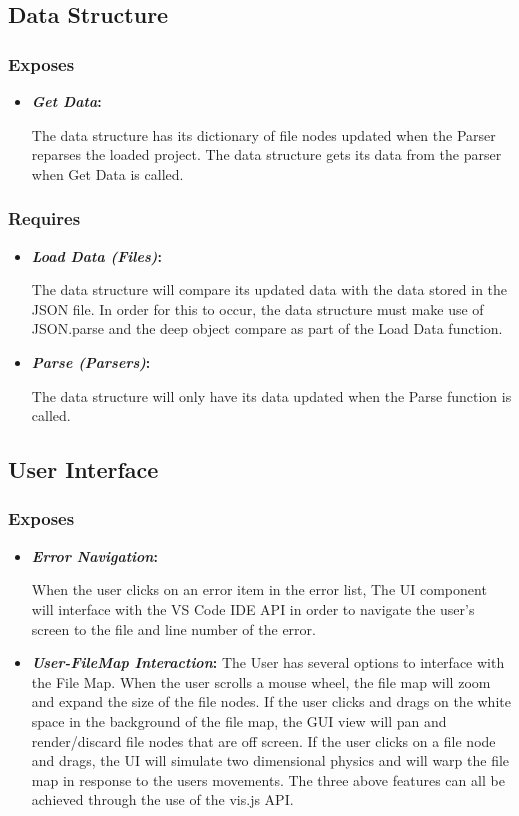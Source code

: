 \documentclass[letterpaper,10pt,titlepage,draftclsnofoot,onecolumn,onesided] {IEEEtran}
\newcommand{\boldit}[2]{
	\textbf{\textit{#1}#2}
}
\begin{document}
\subsection{Data Structure}
		
\subsubsection{Exposes}
\begin{itemize}
	\item \boldit{Get Data}{:} 
The data structure has its dictionary of file nodes updated when the Parser reparses the loaded project. 
The data structure gets its data from the parser when Get Data is called.
\end{itemize}
		
\subsubsection{Requires}
\begin{itemize}
	\item \boldit{Load Data (Files)}{:} 
The data structure will compare its updated data with the data stored in the JSON file. 
In order for this to occur, the data structure must make use of JSON.parse and the deep object compare as part of the Load Data function. \cite{stringify}
	\item \boldit{Parse (Parsers)}{:} 
The data structure will only have its data updated when the Parse function is called.
\end{itemize}
	
\subsection{User Interface}
		
\subsubsection{Exposes}
\begin{itemize}
	\item \boldit{Error Navigation}{:} 
When the user clicks on an error item in the error list, The UI component will interface with the VS Code IDE API in order to navigate the user's screen to the file and line number of the error.
	\item \boldit{User-FileMap Interaction}{:} The User has several options to interface with the File Map. 
When the user scrolls a mouse wheel, the file map will zoom and expand the size of the file nodes.
If the user clicks and drags on the white space in the background of the file map, the GUI view will pan and render/discard file nodes that are off screen.
If the user clicks on a file node and drags, the UI will simulate two dimensional physics and will warp the file map in response to the users movements.
The three above features can all be achieved through the use of the vis.js API.
\end{itemize}
		
\end{document}
